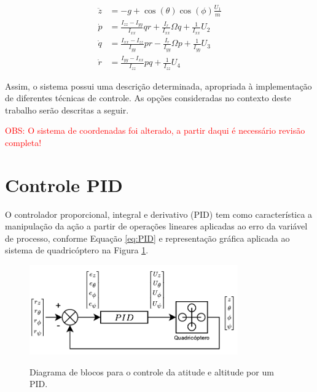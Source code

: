 \documentclass[main.tex]{subfiles}
\begin{document}
\begin{equation}\label{eq:dinamica_atitude_altitude}
    \begin{split}
        \ddot{z} &= -g + \cos{(\theta)}\cos{(\phi)}\frac{U_1}{m}\\
        \dot{p} &= \frac{I_{zz} - I_{yy}}{I_{xx}}qr + \frac{I_r}{I_{xx}}\Omega q + \frac{1}{I_{xx}}U_2\\
        \dot{q} &= \frac{I_{xx} - I_{zz}}{I_{yy}}pr - \frac{I_r}{I_{yy}}\Omega p + \frac{1}{I_{yy}}U_3\\
        \dot{r} &= \frac{I_{yy} - I_{xx}}{I_{zz}}pq + \frac{1}{I_{zz}}U_4
    \end{split}
\end{equation}

Assim, o sistema possui uma descrição determinada, apropriada à implementação de diferentes técnicas de controle. As opções consideradas no contexto deste trabalho serão descritas a seguir.

\textcolor{red}{OBS: O sistema de coordenadas foi alterado, a partir daqui é necessário revisão completa!}

\section{Controle PID}

O controlador proporcional, integral e derivativo (PID) tem como característica a manipulação da ação a partir de operações lineares aplicadas ao erro da variável de processo, conforme Equação \ref{eq:PID} e representação gráfica aplicada ao sistema de quadricóptero na Figura \ref{fig:PID}.

\begin{figure}[!h]
    \centering
    \caption{Diagrama de blocos para o controle da atitude e altitude por um PID.}
    \includegraphics[width=0.8\textwidth]{capitulos/controle_atitude/imgs/controle_PID.png}
    \label{fig:PID}
\end{figure}
\end{document}
